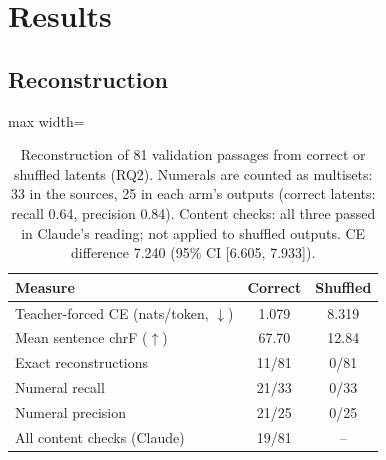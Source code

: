 \documentclass[11pt,a4paper]{article}
\begin{document}
\section{Results}
\label{sec:results}

\subsection{Reconstruction}
\label{sec:res-recon}

\begin{table}[t]
\centering
\small
\begin{adjustbox}{max width=\columnwidth}
\begin{tabular}{lcc}
\toprule
Measure & Correct & Shuffled \\
\midrule
Teacher-forced CE (nats/token, $\downarrow$) & 1.079 & 8.319 \\
Mean sentence chrF ($\uparrow$) & 67.70 & 12.84 \\
Exact reconstructions & 11/81 & 0/81 \\
Numeral recall & 21/33 & 0/33 \\
Numeral precision & 21/25 & 0/25 \\
All content checks (Claude) & 19/81 & -- \\
\bottomrule
\end{tabular}
\end{adjustbox}
\caption{Reconstruction of 81 validation passages from correct or shuffled latents (RQ2). Numerals are counted as multisets: 33 in the sources, 25 in each arm's outputs (correct latents: recall 0.64, precision 0.84). Content checks: all three passed in Claude's reading; not applied to shuffled outputs. CE difference 7.240 (95\% CI [6.605, 7.933]).}
\label{tab:recon}
\end{table}
\end{document}
